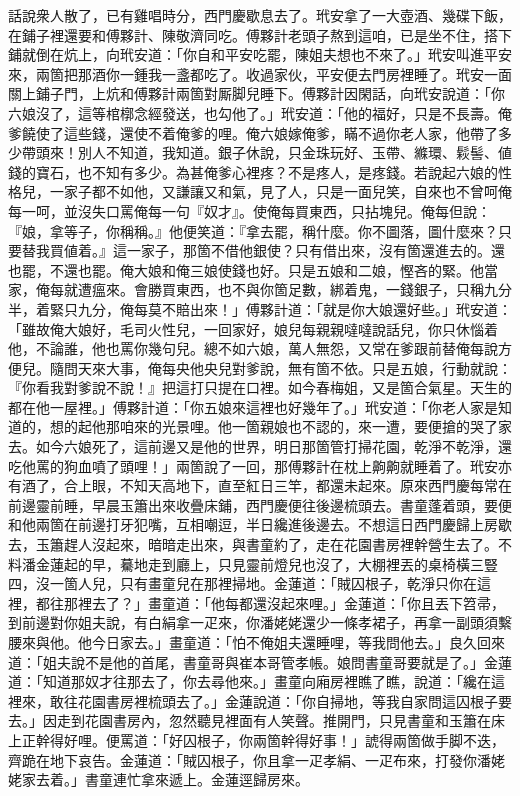 話說衆人散了，已有雞唱時分，西門慶歇息去了。玳安拿了一大壺酒、幾碟下飯，在鋪子裡還要和傅夥計、陳敬濟同吃。傅夥計老頭子熬到這咱，已是坐不住，搭下鋪就倒在炕上，向玳安道：「你自和平安吃罷，陳姐夫想也不來了。」玳安叫進平安來，兩箇把那酒你一鍾我一盞都吃了。收過家伙，平安便去門房裡睡了。玳安一面關上鋪子門，上炕和傅夥計兩箇對厮脚兒睡下。傅夥計因閑話，向玳安說道：「你六娘沒了，這等棺槨念經發送，也勾他了。」玳安道：「他的福好，只是不長壽。俺爹饒使了這些錢，還使不着俺爹的哩。俺六娘嫁俺爹，瞞不過你老人家，他帶了多少帶頭來！別人不知道，我知道。銀子休說，只金珠玩好、玉帶、縧環、鬏髻、値錢的寶石，也不知有多少。為甚俺爹心裡疼？不是疼人，是疼錢。{}若說起六娘的性格兒，一家子都不如他，又謙讓又和氣，見了人，只是一面兒笑，自來也不曾呵俺每一呵，並沒失口罵俺每一句『奴才』。使俺每買東西，只拈塊兒。俺每但說：『娘，拿等子，你稱稱。』他便笑道：『拿去罷，稱什麼。你不圖落，圖什麼來？只要替我買値着。』這一家子，那箇不借他銀使？只有借出來，沒有箇還進去的。還也罷，不還也罷。俺大娘和俺三娘使錢也好。只是五娘和二娘，慳吝的緊。他當家，俺每就遭瘟來。會勝買東西，也不與你箇足數，綁着鬼，一錢銀子，只稱九分半，着緊只九分，俺每莫不賠出來！」{}傅夥計道：「就是你大娘還好些。」玳安道：「雖故俺大娘好，毛司火性兒，一回家好，娘兒每親親噠噠說話兒，你只休惱着他，不論誰，他也罵你幾句兒。{}總不如六娘，萬人無怨，又常在爹跟前替俺每說方便兒。隨問天來大事，俺每央他央兒對爹說，無有箇不依。只是五娘，行動就說：『你看我對爹說不說！』把這打只提在口裡。如今春梅姐，又是箇合氣星。天生的都在他一屋裡。」{}傅夥計道：「你五娘來這裡也好幾年了。」玳安道：「你老人家是知道的，想的起他那咱來的光景哩。{}他一箇親娘也不認的，來一遭，要便搶的哭了家去。{}如今六娘死了，這前邊又是他的世界，明日那箇管打掃花園，乾淨不乾淨，還吃他罵的狗血噴了頭哩！」兩箇說了一回，那傅夥計在枕上齁齁就睡着了。{}玳安亦有酒了，合上眼，不知天高地下，直至紅日三竿，都還未起來。原來西門慶每常在前邊靈前睡，早晨玉簫出來收疊床鋪，西門慶便往後邊梳頭去。書童蓬着頭，要便和他兩箇在前邊打牙犯嘴，互相嘲逗，半日纔進後邊去。不想這日西門慶歸上房歇去，玉簫趕人沒起來，暗暗走出來，與書童約了，走在花園書房裡幹營生去了。不料潘金蓮起的早，驀地走到廳上，只見靈前燈兒也沒了，大棚裡丟的桌椅橫三豎四，沒一箇人兒，{}只有畫童兒在那裡掃地。金蓮道：「賊囚根子，乾淨只你在這裡，都往那裡去了？」畫童道：「他每都還沒起來哩。」金蓮道：「你且丟下笤帚，到前邊對你姐夫說，有白絹拿一疋來，你潘姥姥還少一條孝裙子，再拿一副頭須繫腰來與他。他今日家去。」畫童道：「怕不俺姐夫還睡哩，等我問他去。」良久回來道：「姐夫說不是他的首尾，書童哥與崔本哥管孝帳。娘問書童哥要就是了。」金蓮道：「知道那奴才往那去了，你去尋他來。」畫童向廂房裡瞧了瞧，{}說道：「纔在這裡來，敢往花園書房裡梳頭去了。」金蓮說道：「你自掃地，等我自家問這囚根子要去。」因走到花園書房內，忽然聽見裡面有人笑聲。推開門，只見書童和玉簫在床上正幹得好哩。便罵道：「好囚根子，你兩箇幹得好事！」諕得兩箇做手脚不迭，齊跪在地下哀告。金蓮道：「賊囚根子，你且拿一疋孝絹、一疋布來，打發你潘姥姥家去着。」書童連忙拿來遞上。金蓮逕歸房來。

